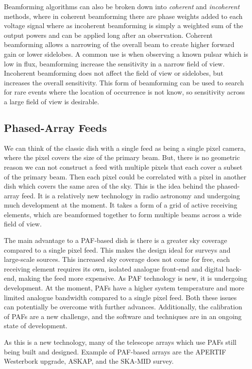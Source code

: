 \documentclass[usenatbib,usegraphicx]{article}
\begin{document}
Beamforming algorithms can also be broken down into \emph{coherent} and \emph{incoherent} methods, where in coherent beamforming there are phase weights added to each voltage signal where as incoherent beamforming is simply a weighted sum of the output powers and can be applied long after an observation.
Coherent beamforming allows a narrowing of the overall beam to create higher forward gain or lower sidelobes.
A common use is when observing a known pulsar which is low in flux, beamforming increase the sensitivity in a narrow field of view.
Incoherent beamforming does not affect the field of view or sidelobes, but increases the overall sensitivity.
This form of beamforming can be used to search for rare events where the location of occurrence is not know, so sensitivity across a large field of view is desirable.

\subsection{Phased-Array Feeds}

We can think of the classic dish with a single feed as being a single pixel camera, where the pixel covers the size of the primary beam.
But, there is no geometric reason we can not construct a feed with multiple pixels that each cover a subset of the primary beam.
Then each pixel could be correlated with a pixel in another dish which covers the same area of the sky.
This is the idea behind the phased-array feed.
It is a relatively new technology in radio astronomy and undergoing much development at the moment.
It takes a form of a grid of active receiving elements, which are beamformed together to form multiple beams across a wide field of view.

The main advantage to a PAF-based dish is there is a greater sky coverage compared to a single pixel feed.
This makes the design ideal for surveys and large-scale sources.
This increased sky coverage does not come for free, each receiving element requires its own, isolated analogue front-end and digital back-end, making the feed more expensive.
As PAF technology is new, it is undergoing development.
At the moment, PAFs have a higher system temperature and more limited analogue bandwidth compared to a single pixel feed.
Both these issues can potentially be overcome with further advances.
Additionally, the calibration of PAFs are a new challenge, and the software and techniques are in an ongoing state of development.

As this is a new technology, many of the telescope arrays which use PAFs still being built and designed.
Example of PAF-based arrays are the APERTIF Westerbork upgrade, ASKAP, and the SKA-MID survey.
\end{document}
